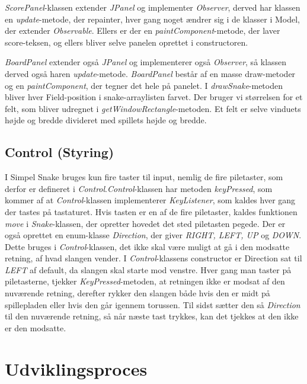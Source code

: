 \documentclass{report}
\begin{document}
\textit{ScorePanel}-klassen extender \textit{JPanel} og implementer \textit{Observer}, derved har klassen en \textit{update}-metode, der repainter, hver gang noget ændrer sig i de klasser i Model, der extender \textit{Observable}.
Ellers er der en \textit{paintComponent}-metode, der laver score-teksen, og ellers bliver selve panelen oprettet i constructoren.
\linebreak

\textit{BoardPanel} extender også \textit{JPanel} og implementerer også \textit{Observer}, så klassen derved også haren \textit{update}-metode. \textit{BoardPanel} består af en masse draw-metoder og en \textit{paintComponent}, der tegner det hele på panelet.
I \textit{drawSnake}-metoden bliver hver Field-position i snake-arraylisten farvet. Der bruger vi størrelsen for et felt, som bliver udregnet i \textit{getWindowRectangle}-metoden. Et felt er selve vinduets højde og bredde divideret med spillets højde og bredde. 

\subsection{Control (Styring)}
I Simpel Snake bruges kun fire taster til input, nemlig de fire piletaster, som derfor er defineret i \textit{Control}.\textit{Control}-klassen har metoden \textit{keyPressed}, som kommer af at \textit{Control}-klassen implementerer \textit{KeyListener}, som kaldes hver gang der tastes på tastaturet. Hvis tasten er en af de fire piletaster, kaldes funktionen \textit{move} i \textit{Snake}-klassen, der opretter hovedet det sted piletasten pegede.
Der er også oprettet en enum-klasse \textit{Direction}, der giver \textit{RIGHT, LEFT, UP} og \textit{DOWN}. Dette bruges i \textit{Control}-klassen, det ikke skal være muligt at gå i den modsatte retning, af hvad slangen vender. 
I \textit{Control}-klassens constructor er Direction sat til \textit{LEFT} af default, da slangen skal starte mod venstre. Hver gang man taster på piletasterne, tjekker \textit{KeyPressed}-metoden, at retningen ikke er modsat af den nuværende retning, derefter rykker den slangen både hvis den er midt på spillepladen eller hvis den går igennem torussen. Til sidst sætter den så \textit{Direction} til den nuværende retning, så når næste tast trykkes, kan det tjekkes at den ikke er den modsatte.

\section{Udviklingsproces}
\end{document}
